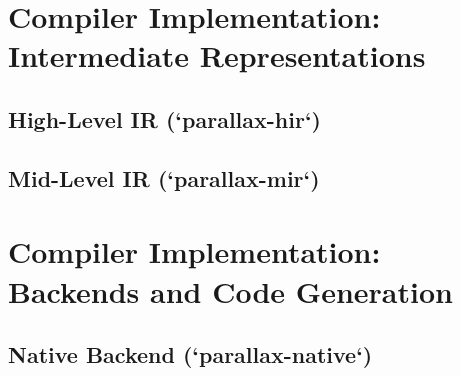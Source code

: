 \section{Compiler Implementation: Intermediate Representations}

\subsection{High-Level IR (`parallax-hir`)}

\subsection{Mid-Level IR (`parallax-mir`)}

\section{Compiler Implementation: Backends and Code Generation}

\subsection{Native Backend (`parallax-native`)}

